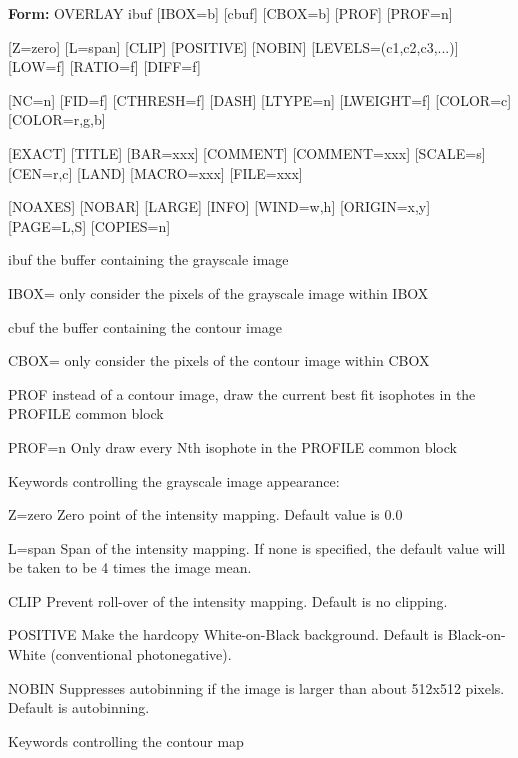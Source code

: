 {\newpage\clearpage
{}%
\begin{command}
  \item[\textbf{Form:} OVERLAY ibuf {[IBOX=b]} {[cbuf]} {[CBOX=b]} {[PROF]} 
       {[PROF=n]}\hfill]{}
  \item[{[Z=zero]} {[L=span]} {[CLIP]} {[POSITIVE]} {[NOBIN]}
        {[LEVELS=(c1,c2,c3,...)]} {[LOW=f]} {[RATIO=f]} {[DIFF=f]}]{}
  \item[{[NC=n]} {[FID=f]} {[CTHRESH=f]} {[DASH]} {[LTYPE=n]} {[LWEIGHT=f]} 
        {[COLOR=c]} {[COLOR=r,g,b]}]{}
  \item[{[EXACT]} {[TITLE]} {[BAR=xxx]} {[COMMENT]} {[COMMENT=xxx]}
        {[SCALE=s]} {[CEN=r,c]} {[LAND]} {[MACRO=xxx]} {[FILE=xxx]}]{}
  \item[{[NOAXES]} {[NOBAR]} {[LARGE]} {[INFO]} {[WIND=w,h]} {[ORIGIN=x,y]} 
        {[PAGE=L,S]} {[COPIES=n]}]{}
  \item[ibuf ]{the buffer containing the grayscale image}
  \item[IBOX=]{only consider the pixels of the grayscale image within IBOX}
  \item[cbuf]{ the buffer containing the contour image}
  \item[CBOX=]{only consider the pixels of the contour image within CBOX}
  \item[PROF]{ instead of a contour image, draw the current best fit 
isophotes in the PROFILE common block}
  \item[PROF=n]{Only draw every Nth isophote in the PROFILE common block}
  \item[Keywords controlling the grayscale image appearance:\hfill]{}
  \item[Z=zero ]{Zero point of the intensity mapping.  Default value is 0.0}
  \item[L=span]{Span of the intensity mapping.  If none is specified, the 
                default value will be taken to be 4 times the image mean.}
  \item[CLIP]{Prevent roll-over of the intensity mapping.  Default is 
              no clipping.}
  \item[POSITIVE]{Make the hardcopy White-on-Black background.  Default is 
                  Black-on-White (conventional photonegative).}
  \item[NOBIN]{Suppresses autobinning if the image is larger than about
               512x512 pixels.  Default is autobinning.}
  \item[Keywords controlling the contour map \hfill]{}

\end{command}}
